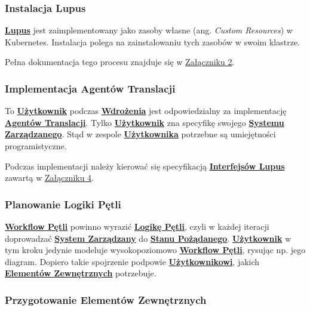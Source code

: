 \subsubsection{Instalacja Lupus}

\hyperlink{def:lupus}{\textbf{Lupus}} jest zaimplementowany jako zasoby własne (ang. \textit{Custom Resources}) w Kubernetes. Instalacja polega na zainstalowaniu tych zasobów w swoim klastrze. 

Pełna dokumentacja tego procesu znajduje się w \hyperref[appendix:2]{Załączniku 2}.

\subsubsection{Implementacja Agentów Translacji}

To \hyperlink{def:uzytkownik}{\textbf{Użytkownik}} podczas \hyperlink{def:wdrozenie-lupus}{\textbf{Wdrożenia}} jest odpowiedzialny za implementację \hyperlink{def:agent-translacji}{\textbf{Agentów Translacji}}. Tylko \hyperlink{def:uzytkownik}{\textbf{Użytkownik}} zna specyfikę swojego \hyperlink{def:system-zarzadzany}{\textbf{Systemu Zarządzanego}}. Stąd w zespole \hyperlink{def:uzytkownik}{\textbf{Użytkownika}} potrzebne są umiejętności programistyczne. 

Podczas implementacji należy kierować się specyfikacją \hyperlink{def:interfejsy-lupus}{\textbf{Interfejsów Lupus}} zawartą w \hyperref[appendix:4]{Załączniku 4}.

\subsubsection{Planowanie Logiki Pętli}

\hyperlink{def:workflow-petli}{\textbf{Workflow Pętli}} powinno wyrazić \hyperlink{def:logika-petli}{\textbf{Logikę Pętli}}, czyli w każdej iteracji doprowadzać \hyperlink{def:system-zarzadzany}{\textbf{System Zarządzany}} do \hyperlink{def:stan-pozadany}{\textbf{Stanu Pożądanego}}. \hyperlink{def:uzytkownik}{\textbf{Użytkownik}} w tym kroku jedynie modeluje wysokopoziomowo \hyperlink{def:workflow-petli}{\textbf{Workflow Pętli}}, rysując np. jego diagram. Dopiero takie spojrzenie podpowie \hyperlink{def:uzytkownik}{\textbf{Użytkownikowi}}, jakich \hyperlink{def:element-zewnetrzny}{\textbf{Elementów Zewnętrznych}} potrzebuje.

\subsubsection{Przygotowanie Elementów Zewnętrznych}

